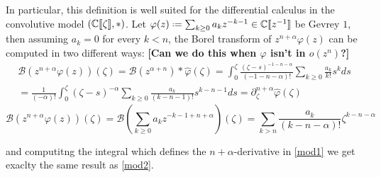 \documentclass[11pt,a4paper,twoside,leqno,noamsfonts]{amsart}
\numberwithin{equation}{section}
\begin{document}
In particular, this definition is well suited for the differential calculus in the convolutive model $\left(\mathbb C[\![\zeta]\!], \ast\right)$. Let $\varphi(z)\defeq\sum_{k\geq 0}a_kz^{-k-1}\in\C[\![z^{-1}]\!]$ be Gevrey $1$, then assuming $a_k=0$ for every $k<n$, the Borel transform of $z^{n+\alpha}\varphi(z)$ can be computed in two different ways: \textbf{[Can we do this when $\varphi$ isn't in $o(z^n)$?]}
\begin{multline}
\label{mod1}
\mathcal{B}\left(z^{n+\alpha}\varphi(z)\right)(\zeta)=\mathcal{B}(z^{\alpha+n})\ast\hat{\varphi}(\zeta)=\int_0^{\zeta}\frac{(\zeta-s)^{-1-n-\alpha}}{(-1-n-\alpha)!}\sum_{k\geq 0}\frac{a_k}{k!}s^{k}ds\\
=\frac{1}{(-\alpha)!}\int_0^{\zeta}(\zeta-s)^{-\alpha}\sum_{k\geq 0}\frac{a_k}{(k-n-1)!}s^{k-n-1}ds=\partial_{\zeta}^{n+\alpha}\hat{\varphi}(\zeta)
\end{multline}
\begin{equation}
\label{mod2}
\mathcal{B}\left(z^{n+\alpha}\varphi(z)\right)(\zeta)=\mathcal{B}\left(\sum_{k\geq 0}a_kz^{-k-1+n+\alpha}\right)(\zeta)=\sum_{k>n}\frac{a_k}{(k-n-\alpha)!}\zeta^{k-n-\alpha}
\end{equation}

and computitng the integral which defines the $n+\alpha$-derivative in \eqref{mod1} we get exaclty the same result as \eqref{mod2}.
\color{black}
\end{document}
